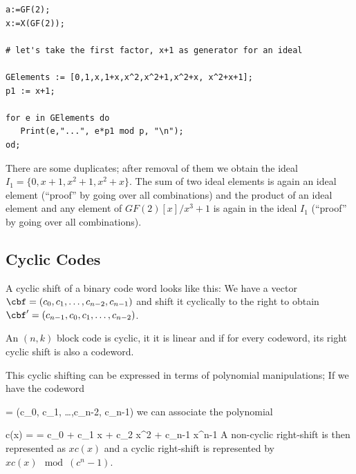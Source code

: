 \begin{verbatim}
a:=GF(2);
x:=X(GF(2));

# let's take the first factor, x+1 as generator for an ideal

GElements := [0,1,x,1+x,x^2,x^2+1,x^2+x, x^2+x+1];
p1 := x+1;

for e in GElements do
   Print(e,"...", e*p1 mod p, "\n");
od;
\end{verbatim}

There are some duplicates; after removal of them we obtain the ideal $I_1 = \{0, x+1, x^2+1, x^2+x\}$. The sum of two ideal elements is again an ideal element (``proof'' by going over all combinations) and the product of an ideal element and any element of $GF(2)[x]/x^3+1$ is again in the ideal $I_1$ (``proof'' by going over all combinations).

\subsection{Cyclic Codes}

A cyclic shift of a binary code word looks like this: We have a vector $\cbf = (c_0, c_1, \ldots,c_{n-2}, c_{n-1})$ and shift it cyclically to the right to obtain $\cbf' = (c_{n-1}, c_0, c_1, \ldots, c_{n-2})$.

\begin{definition}
  An $(n,k)$ block code is cyclic, it it is linear and if for every codeword, its right cyclic shift is also a codeword.
\end{definition}


This cyclic shifting can be expressed in terms of polynomial manipulations; If we have the codeword

\bee
\cbf = (c_0, c_1, \ldots,c_{n-2}, c_{n-1})
\eee
%
we can associate the polynomial

\bee
c(x) = \cbf = c_0 + c_1 x + c_2 x^2 + \cdots c_{n-1} x^{n-1}
\eee
%
A non-cyclic right-shift is then represented as $xc(x)$ and a cyclic right-shift is represented by $xc(x) \mod (c^n-1)$.
